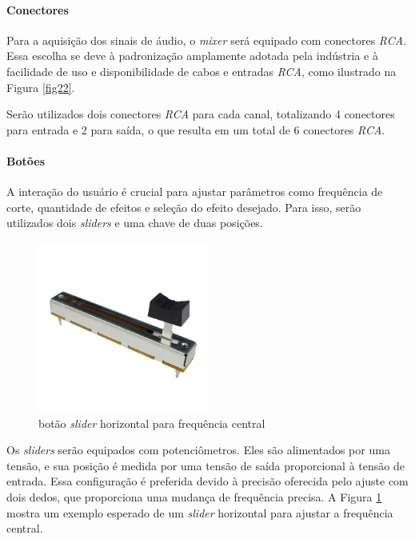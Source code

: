 \paragraph{Conectores}
Para a aquisição dos sinais de áudio, o \textit{mixer} será equipado com conectores \textit{RCA}. Essa escolha se deve à padronização amplamente adotada pela indústria e à facilidade de uso e disponibilidade de cabos e entradas \textit{RCA}, como ilustrado na Figura \ref{fig22}.

Serão utilizados dois conectores \textit{RCA} para cada canal, totalizando 4 conectores para entrada e 2 para saída, o que resulta em um total de 6 conectores \textit{RCA}.

\paragraph{Botões}
A interação do usuário é crucial para ajustar parâmetros como frequência de corte, quantidade de efeitos e seleção do efeito desejado. Para isso, serão utilizados dois \textit{sliders} e uma chave de duas posições.


\begin{figure}[h]
    \centering
    \includegraphics[width=0.5\textwidth]{figuras/fig61.png}
    \caption{botão \textit{slider} horizontal para frequência central \cite{robocore}}
    \label{fig61}
\end{figure}

Os \textit{sliders} serão equipados com potenciômetros. Eles são alimentados por uma tensão, e sua posição é medida por uma tensão de saída proporcional à tensão de entrada. Essa configuração é preferida devido à precisão oferecida pelo ajuste com dois dedos, que proporciona uma mudança de frequência precisa. A Figura \ref{fig61} mostra um exemplo esperado de um \textit{slider} horizontal para ajustar a frequência central.

